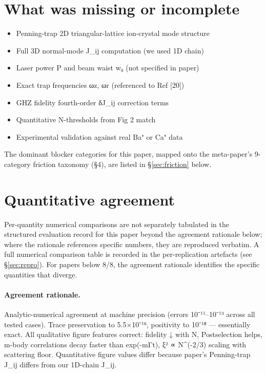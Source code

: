 \documentclass[11pt]{article}
\begin{document}
\section{What was missing or incomplete}
\begin{itemize}
\item Penning-trap 2D triangular-lattice ion-crystal mode structure
\item Full 3D normal-mode J\_ij computation (we used 1D chain)
\item Laser power P and beam waist w₀ (not specified in paper)
\item Exact trap frequencies ωz, ωr (referenced to Ref [20])
\item GHZ fidelity fourth-order δJ\_ij correction terms
\item Quantitative N-thresholds from Fig 2 match
\item Experimental validation against real Ba⁺ or Ca⁺ data
\end{itemize}
The dominant blocker categories for this paper, mapped onto the meta-paper's 9-category friction taxonomy (\S4), are listed in \S\ref{sec:friction} below.

\section{Quantitative agreement}
Per-quantity numerical comparisons are not separately tabulated in the structured evaluation record for this paper beyond the agreement rationale below; where the rationale references specific numbers, they are reproduced verbatim. A full numerical comparison table is recorded in the per-replication artefacts (see \S\ref{sec:repro}). For papers below 8/8, the agreement rationale identifies the specific quantities that diverge.

\paragraph{Agreement rationale.} Analytic-numerical agreement at machine precision (errors 10⁻¹¹–10⁻¹³ across all tested cases). Trace preservation to 5.5×10⁻¹⁶, positivity to 10⁻¹⁸ — essentially exact. All qualitative figure features correct: fidelity ↓ with N, Postselection helps, m-body correlations decay faster than exp(-mΓt), ξ² ∝ N\textasciicircum{}(-2/3) scaling with scattering floor. Quantitative figure values differ because paper's Penning-trap J\_ij differs from our 1D-chain J\_ij.
\end{document}
